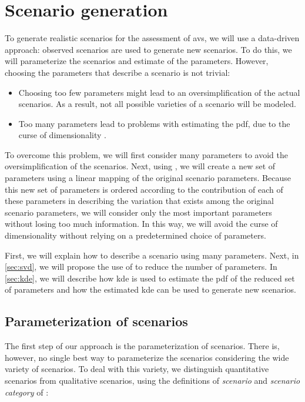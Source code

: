 \section{Scenario generation}
\label{sec:generation}

To generate realistic scenarios for the assessment of \acp{av}, we will use a data-driven approach: observed scenarios are used to generate new scenarios.
To do this, we will parameterize the scenarios and estimate  of the parameters.
However, choosing the parameters that describe a scenario is not trivial:
\begin{itemize}
	\item Choosing too few parameters might lead to an oversimplification of the actual scenarios.
	As a result, not all possible varieties of a scenario will be modeled.
	
	\item Too many parameters lead to problems with estimating the \ac{pdf}, due to the curse of dimensionality \autocite{scott1992multivariate}.
\end{itemize}
To overcome this problem, we will first consider many parameters to avoid the oversimplification of the scenarios. 
Next, using , we will create a new set of parameters using a linear mapping of the original scenario parameters.
Because this new set of parameters is ordered according to the contribution of each of these parameters in describing the variation that exists among the original scenario parameters, we will consider only the most important parameters without losing too much information.
In this way, we will avoid the curse of dimensionality without relying on a predetermined choice of parameters.

First, we will explain how to describe a scenario using many parameters.
Next, in \cref{sec:svd}, we will propose the use of  to reduce the number of parameters.
In \cref{sec:kde}, we will describe how \ac{kde} is used to estimate the \ac{pdf} of the reduced set of parameters and how the estimated \ac{kde} can be used to generate new scenarios.



\subsection{Parameterization of scenarios}
\label{sec:parameterization}

The first step of our approach is the parameterization of scenarios.
There is, however, no single best way to parameterize the scenarios considering the wide variety of scenarios.
To deal with this variety, we distinguish quantitative scenarios from qualitative scenarios, using the definitions of \emph{scenario} and \emph{scenario category} of \autocite{degelder2020ontology}:

